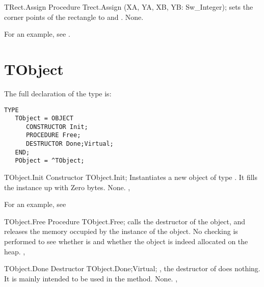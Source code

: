 \html{}

\begin{procedure}{TRect.Assign}
\Declaration
Procedure Trect.Assign (XA, YA, XB, YB: Sw\_Integer);
\Description
{} sets the corner points of the rectangle to  and 
.
\Errors
None.
\SeeAlso
{}
\end{procedure}

For an example, see .

\section{TObject}
\label{se:TObject}

The full declaration of the  type is:
\begin{verbatim}
TYPE
   TObject = OBJECT
      CONSTRUCTOR Init;
      PROCEDURE Free;
      DESTRUCTOR Done;Virtual;
   END;
   PObject = ^TObject;
\end{verbatim}
\begin{procedure}{TObject.Init}
\Declaration
Constructor TObject.Init;
\Description
Instantiates a new object of type . It fills the instance up
with Zero bytes.
\Errors
None.
\SeeAlso
{}, 
\end{procedure}

For an example, see 

\begin{procedure}{TObject.Free}
\Declaration
Procedure TObject.Free;
\Description
{} calls the destructor of the object, and releases the memory
occupied by the instance of the object.
\Errors
No checking is performed to see whether  is  and whether
the object is indeed allocated on the heap.
\SeeAlso
{}, 
\end{procedure}

\html{}

\begin{procedure}{TObject.Done}
\Declaration
Destructor TObject.Done;Virtual;
\Description
{}, the destructor of  does nothing. It is mainly
intended to be used in the  method.
\Errors
None.
\SeeAlso
{}, 
\end{procedure}

